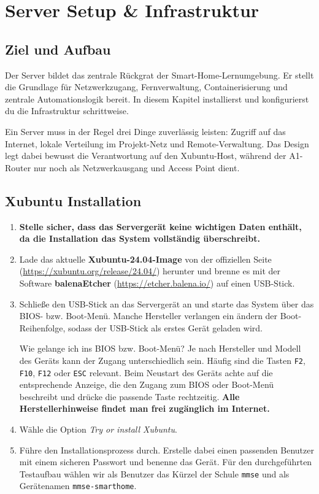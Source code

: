 \chapter{Server Setup \& Infrastruktur}

\section{Ziel und Aufbau}

Der Server bildet das zentrale Rückgrat der Smart-Home-Lernumgebung. Er stellt die Grundlage für Netzwerkzugang, Fernverwaltung, Containerisierung und zentrale Automationslogik bereit. In diesem Kapitel installierst und konfigurierst du die Infrastruktur schrittweise.

Ein Server muss in der Regel drei Dinge zuverlässig leisten: Zugriff auf das Internet, lokale Verteilung im Projekt-Netz und Remote-Verwaltung. Das Design legt dabei bewusst die Verantwortung auf den Xubuntu-Host, während der A1-Router nur noch als Netzwerkausgang und Access Point dient.

\section{Xubuntu Installation}

\begin{enumerate}
    \item \textbf{Stelle sicher, dass das Servergerät keine wichtigen Daten enthält, da die Installation das System vollständig überschreibt.}
    \item Lade das aktuelle \textbf{Xubuntu-24.04-Image} von der offiziellen Seite (\url{https://xubuntu.org/release/24.04/}) herunter und brenne es mit der Software \textbf{balenaEtcher} (\url{https://etcher.balena.io/}) auf einen USB-Stick. 
    \item Schließe den USB-Stick an das Servergerät an und starte das System über das BIOS- bzw. Boot-Menü. Manche Hersteller verlangen ein ändern der Boot-Reihenfolge, sodass der USB-Stick als erstes Gerät geladen wird.
    \begin{InfoBox}{Wie gelange ich ins BIOS bzw. Boot-Menü?} 
        \scriptsize Je nach Hersteller und Modell des Geräts kann der Zugang unterschiedlich sein. Häufig sind die Tasten \texttt{F2}, \texttt{F10}, \texttt{F12} oder \texttt{ESC} relevant. Beim Neustart des Geräts achte auf die entsprechende Anzeige, die den Zugang zum BIOS oder Boot-Menü beschreibt und drücke die passende Taste rechtzeitig. \textbf{Alle Herstellerhinweise findet man frei zugänglich im Internet.}
    \end{InfoBox}
    \item Wähle die Option \textit{Try or install Xubuntu}.
    \item Führe den Installationsprozess durch. Erstelle dabei einen passenden Benutzer mit einem sicheren Passwort und benenne das Gerät. Für den durchgeführten Testaufbau wählen wir als Benutzer das Kürzel der Schule \texttt{mmse} und als Gerätenamen \texttt{mmse-smarthome}.
\end{enumerate}

